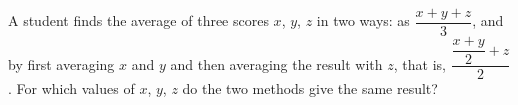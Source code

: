 A student finds the average of three scores $x$, $y$, $z$ in two ways: as $\dfrac{x+y+z}{3}$, and by first averaging $x$ and $y$ and then averaging the result with $z$, that is, $\dfrac{\dfrac{x+y}{2}+z}{2}$. For which values of $x$, $y$, $z$ do the two methods give the same result?
